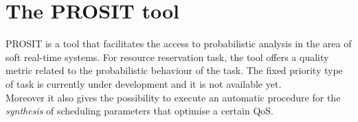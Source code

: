 \chapter{The PROSIT tool}\label{chp:tool}


PROSIT is a tool that facilitates the access to probabilistic analysis in the area of soft real-time systems. For resource reservation task, the tool offers a quality metric related to the probabilistic behaviour of the task. The fixed priority type of task is currently under development and it is not available yet.\\
Moreover it also gives the possibility to execute an automatic procedure for the \emph{synthesis} of scheduling parameters that optimise a certain QoS.

